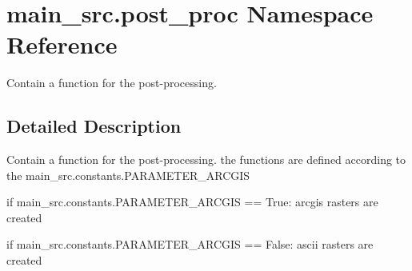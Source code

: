 \hypertarget{namespacemain__src_1_1post__proc}{\section{main\-\_\-src.\-post\-\_\-proc Namespace Reference}
\label{namespacemain__src_1_1post__proc}
}


Contain a function for the post-\/processing.  




\subsection{Detailed Description}
Contain a function for the post-\/processing. the functions are defined according to the main\-\_\-src.\-constants.\-P\-A\-R\-A\-M\-E\-T\-E\-R\-\_\-\-A\-R\-C\-G\-I\-S \par
 if main\-\_\-src.\-constants.\-P\-A\-R\-A\-M\-E\-T\-E\-R\-\_\-\-A\-R\-C\-G\-I\-S == True\-: arcgis rasters are created \par
 \par
 if main\-\_\-src.\-constants.\-P\-A\-R\-A\-M\-E\-T\-E\-R\-\_\-\-A\-R\-C\-G\-I\-S == False\-: ascii rasters are created \par
